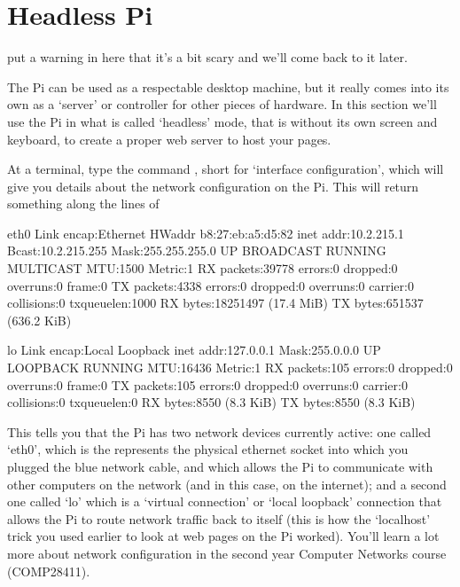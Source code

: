 \section{Headless Pi}
\label{section:headless}



\begin{note}
put a warning in here that it's a bit scary and we'll come back to it later.
\end{note}



The Pi can be used as a respectable desktop machine, but it really comes into its own as a `server' or controller for other pieces of hardware. In this section we'll use the Pi in what is called `headless' mode, that is without its own screen and keyboard, to create a proper web server to host your pages. 

At a terminal, type the command , short for `interface configuration', which will give you details about the network configuration on the Pi. This will return something along the lines of

\begin{ttoutenv}
eth0      Link encap:Ethernet  HWaddr b8:27:eb:a5:d5:82
          inet addr:10.2.215.1  Bcast:10.2.215.255  Mask:255.255.255.0
          UP BROADCAST RUNNING MULTICAST  MTU:1500  Metric:1
          RX packets:39778 errors:0 dropped:0 overruns:0 frame:0
          TX packets:4338 errors:0 dropped:0 overruns:0 carrier:0
          collisions:0 txqueuelen:1000
          RX bytes:18251497 (17.4 MiB)  TX bytes:651537 (636.2 KiB)

lo        Link encap:Local Loopback
          inet addr:127.0.0.1  Mask:255.0.0.0
          UP LOOPBACK RUNNING  MTU:16436  Metric:1
          RX packets:105 errors:0 dropped:0 overruns:0 frame:0
          TX packets:105 errors:0 dropped:0 overruns:0 carrier:0
          collisions:0 txqueuelen:0
          RX bytes:8550 (8.3 KiB)  TX bytes:8550 (8.3 KiB)
\end{ttoutenv}

This tells you that the Pi has two network devices currently active: one called `eth0', which is the represents the physical ethernet socket into which you plugged the blue network cable, and which allows the Pi to communicate with other computers on the network (and in this case, on the internet); and a second one called `lo' which is a `virtual connection' or `local loopback' connection that allows the Pi to route network traffic back to itself (this is how the `localhost' trick you used earlier to look at web pages on the Pi worked). You'll learn a lot more about network configuration in the second year Computer Networks course (COMP28411). 

